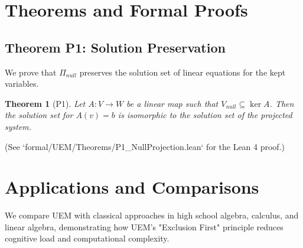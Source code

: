 \documentclass{article}
\newtheorem{theorem}{Theorem}[section]
\begin{document}
\section{Theorems and Formal Proofs}
\label{sec:proofs}
\subsection{Theorem P1: Solution Preservation}
We prove that $\Pi_{null}$ preserves the solution set of linear equations for the kept variables.
\begin{theorem}[P1]
Let $A: V \to W$ be a linear map such that $V_{null} \subseteq \ker A$. Then the solution set for $A(v) = b$ is isomorphic to the solution set of the projected system.
\end{theorem}
(See `formal/UEM/Theorems/P1_NullProjection.lean` for the Lean 4 proof.)

\section{Applications and Comparisons}
\label{sec:applications}
We compare UEM with classical approaches in high school algebra, calculus, and linear algebra, demonstrating how UEM's "Exclusion First" principle reduces cognitive load and computational complexity.
\end{document}
